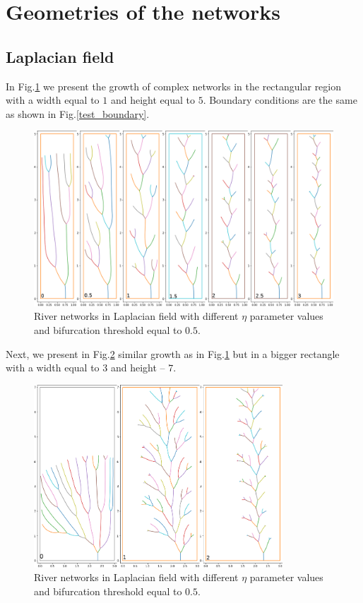 \documentclass[]{pracamgr}
\begin{document}
    \section{Geometries of the networks}

      \subsection{Laplacian field}
        
        In Fig.\ref{laplacian_etas} we present the growth of complex networks in the rectangular region with a width equal to $1$ and height equal to $5$. Boundary conditions are the same as shown in Fig.\ref{test_boundary}.
      
        \begin{figure}[H]
          \centering
          \includegraphics[width=1\textwidth]{figs/sims/laplacian_field_etas.png}         
          \caption{River networks in Laplacian field with different $\eta$ parameter values and bifurcation threshold equal to $0.5$.}
          \label{laplacian_etas}
        \end{figure} 

        Next, we present in Fig.\ref{laplacian_big_etas} similar growth as in Fig.\ref{laplacian_etas} but in a bigger rectangle with a width equal to $3$ and height -- $7$.

        \begin{figure}[H]
          \centering
          \includegraphics[width=0.83\textwidth]{figs/sims/laplacian_big_field_etas.png}        
          \caption{River networks in Laplacian field with different $\eta$ parameter values and bifurcation threshold equal to $0.5$.}
          \label{laplacian_big_etas}
        \end{figure}
\end{document}

